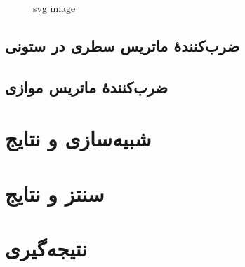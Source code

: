 \documentclass[conference]{IEEEtran-ModifiedForMVIP}
\begin{document}
\begin{figure}
    \centering
    
    \caption{svg image}
\end{figure}
  

% 

\subsection{
    ضرب‌کنندهٔ ماتریس سطری در ستونی
}

\subsection{
    ضرب‌کنندهٔ ماتریس موازی
}

\section{شبیه‌سازی و نتایج}

\section{سنتز و نتایج}

\section{نتیجه‌گیری}



\end{document}
